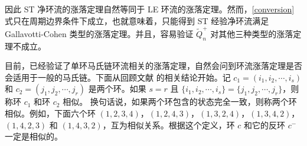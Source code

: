 因此 ST 净环流的涨落定理自然等同于 LE 环流的涨落定理。然而，\eqref{conversion} 式只在周期边界条件下成立，也就意味着，只能得到 ST 经验净环流满足 Gallavotti-Cohen 类型的涨落定理。并且，容易验证 $\tilde{Q}^+_n$ 对其他三种类型的涨落定理不成立。

目前，已经验证了单环马氏链环流相关的涨落定理，自然会问到环流涨落定理是否会适用于一般的马氏链。下面从回顾文献 \cite{jia2016cycle} 的相关结论开始。记 $c_1=(i_1,i_2,\cdots,i_s)$ 和 $c_2=(j_1,j_2,\cdots,j_r)$ 是两个环。如果 $s=r$ 且 $\{i_1,i_2,\cdots,i_s\}=\{j_1,j_2,\cdots,j_r\}$，则称环 $c_1$ 和环 $c_2$ 相似。
换句话说，如果两个环包含的状态完全一致，则称两个环相似。例如，下面六个环 $(1,2,3,4)$，$(1,2,4,3)$，$(1,3,2,4)$，$(1,3,4,2)$，$(1,4,2,3)$ 和 $(1,4,3,2)$，互为相似关系。根据这个定义，环 $c$ 和它的反环 $c^-$ 一定是相似的。

